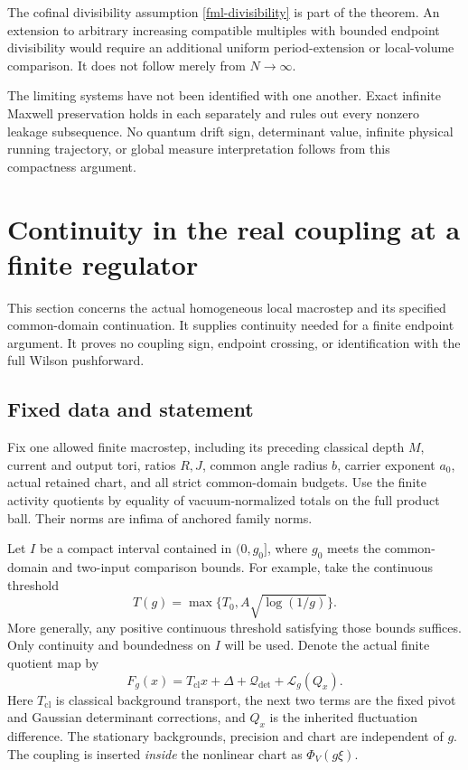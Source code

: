 \documentclass[11pt]{article}
\theoremstyle{remark}
\begin{document}
The cofinal divisibility assumption
\eqref{fml-divisibility} is part of the theorem. An
extension to arbitrary increasing compatible multiples
with bounded endpoint divisibility would require an
additional uniform period-extension or local-volume
comparison. It does not follow merely from \(N\to\infty\).

The limiting systems have not been identified with
one another. Exact infinite Maxwell preservation holds
in each separately and rules out every nonzero leakage
subsequence. No quantum drift sign, determinant value,
infinite physical running trajectory, or global
measure interpretation follows from this compactness
argument.


\section{Continuity in the real coupling at a finite regulator}
\label{fqc-section}

This section concerns the actual homogeneous local macrostep and its
specified common-domain continuation. It supplies continuity needed
for a finite endpoint argument. It proves no coupling sign, endpoint
crossing, or identification with the full Wilson pushforward.

\subsection{Fixed data and statement}
\label{fqc-setup}

Fix one allowed finite macrostep, including its preceding classical
depth $M$, current and output tori, ratios $R,J$, common angle radius
$b$, carrier exponent $a_0$, actual retained chart, and all strict
common-domain budgets. Use the finite activity quotients by equality
of vacuum-normalized totals on the full product ball. Their norms
are infima of anchored family norms.

Let $I$ be a compact interval contained in $(0,g_0]$, where $g_0$
meets the common-domain and two-input comparison bounds. For example,
take the continuous threshold
\begin{equation}
 T(g)=\max\{T_0,A\sqrt{\log(1/g)}\}.
 \label{fqc-threshold}
\end{equation}
More generally, any positive continuous threshold satisfying those
bounds suffices. Only continuity and boundedness on $I$ will be used.
Denote the actual finite quotient map by
\begin{equation}
 F_g(x)=T_{\mathrm{cl}}x+\Delta+\mathcal Q_{\det}
                         +\mathcal L_g(Q_x).
 \label{fqc-map}
\end{equation}
Here $T_{\mathrm{cl}}$ is classical background transport, the next two
terms are the fixed pivot and Gaussian determinant corrections, and
$Q_x$ is the inherited fluctuation difference. The stationary
backgrounds, precision and chart are independent of $g$. The
coupling is inserted \emph{inside} the nonlinear chart as
$\Phi_V(g\xi)$.
\end{document}
